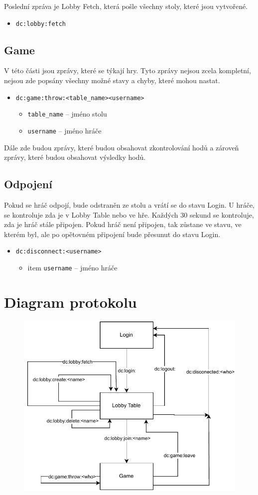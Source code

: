 \documentclass[12pt, a4paper]{article}
\begin{document}
Poslední zpráva je Lobby Fetch, která pošle všechny stoly, které jsou vytvořené.
\begin{itemize}
    \item \texttt{dc:lobby:fetch}
\end{itemize}

\subsection{Game}
V této části jsou zprávy, které se týkají hry.
Tyto zprávy nejsou zcela kompletní, nejsou zde popsány všechny možné stavy a chyby, které mohou nastat.
\begin{itemize}
    \item \texttt{dc:game:throw:<table\_name><username>}
    \begin{itemize}
        \item \texttt{table\_name} -- jméno stolu
        \item \texttt{username} -- jméno hráče
    \end{itemize}
\end{itemize}

Dále zde budou zprávy, které budou obsahovat zkontrolování hodů a zároveň zprávy, které budou obsahovat výsledky hodů.

\subsection{Odpojení}
Pokud se hráč odpojí, bude odstraněn ze stolu a vrátí se do stavu Login.
U hráče, se kontroluje zda je v Lobby Table nebo ve hře.
Každých 30 sekund se kontroluje, zda je hráč stále připojen.
Pokud hráč není připojen, tak zůstane ve stavu, ve kterém byl, ale po opětovném připojení bude přesunut do stavu Login.
\begin{itemize}
    \item \texttt{dc:disconnect:<username>}
    \begin{itemize}
        \item item \texttt{username} -- jméno hráče
    \end{itemize}
\end{itemize}

\pagebreak
\section{Diagram protokolu}
\begin{figure}[H]
    \centering
    \includegraphics[width=\textwidth]{../protocol_diagram.drawio.pdf}
\end{figure}
\end{document}
